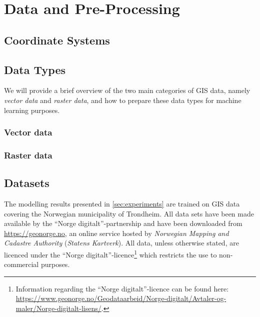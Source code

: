 \chapter{Data and Pre-Processing}%
\label{sec:data}



\section{Coordinate Systems}%
\label{sec:coordinate-systems}


\section{Data Types}%
\label{sec:data-types}

We will provide a brief overview of the two main categories of GIS data, namely \textit{vector data} and \textit{raster data}, and how to prepare these data types for machine learning purposes.

\subsection{Vector data}


\subsection{Raster data}%
\label{sec:raster-data}


\section{Datasets}%
\label{sec:data-sets}

The modelling results presented in \cref{sec:experiments} are trained on GIS data covering the Norwegian municipality of Trondheim.
All data sets have been made available by the \enquote{Norge digitalt}-partnership and have been downloaded from \url{https://geonorge.no}, an online service hosted by \textit{Norwegian Mapping and Cadastre Authority} (\textit{Statens Kartverk}).
All data, unless otherwise stated, are licenced under the \enquote{Norge digitalt}-licence\footnote{Information regarding the \enquote{Norge digitalt}-licence can be found here: \url{https://www.geonorge.no/Geodataarbeid/Norge-digitalt/Avtaler-og-maler/Norge-digitalt-lisens/}.} which restricts the use to non-commercial purposes.

